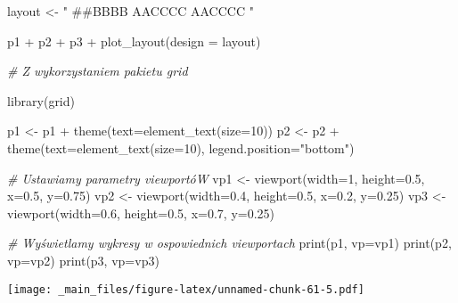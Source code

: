 \documentclass[
]{book}
\newenvironment{Shaded}{\begin{snugshade}}{\end{snugshade}}
\newcommand{\AttributeTok}[1]{\textcolor[rgb]{0.77,0.63,0.00}{#1}}
\newcommand{\CommentTok}[1]{\textcolor[rgb]{0.56,0.35,0.01}{\textit{#1}}}
\newcommand{\DecValTok}[1]{\textcolor[rgb]{0.00,0.00,0.81}{#1}}
\newcommand{\FloatTok}[1]{\textcolor[rgb]{0.00,0.00,0.81}{#1}}
\newcommand{\FunctionTok}[1]{\textcolor[rgb]{0.00,0.00,0.00}{#1}}
\newcommand{\NormalTok}[1]{#1}
\newcommand{\OtherTok}[1]{\textcolor[rgb]{0.56,0.35,0.01}{#1}}
\newcommand{\SpecialCharTok}[1]{\textcolor[rgb]{0.00,0.00,0.00}{#1}}
\newcommand{\StringTok}[1]{\textcolor[rgb]{0.31,0.60,0.02}{#1}}
\begin{document}
\begin{Shaded}
\begin{Highlighting}[]
\NormalTok{layout }\OtherTok{\textless{}{-}} \StringTok{"}
\StringTok{\#\#BBBB}
\StringTok{AACCCC}
\StringTok{AACCCC}
\StringTok{"}

\NormalTok{p1 }\SpecialCharTok{+}\NormalTok{ p2 }\SpecialCharTok{+}\NormalTok{ p3 }\SpecialCharTok{+} 
  \FunctionTok{plot\_layout}\NormalTok{(}\AttributeTok{design =}\NormalTok{ layout)}

\CommentTok{\# Z wykorzystaniem pakietu grid}

\FunctionTok{library}\NormalTok{(grid)}

\NormalTok{p1 }\OtherTok{\textless{}{-}}\NormalTok{ p1 }\SpecialCharTok{+} \FunctionTok{theme}\NormalTok{(}\AttributeTok{text=}\FunctionTok{element\_text}\NormalTok{(}\AttributeTok{size=}\DecValTok{10}\NormalTok{))}
\NormalTok{p2 }\OtherTok{\textless{}{-}}\NormalTok{ p2 }\SpecialCharTok{+} \FunctionTok{theme}\NormalTok{(}\AttributeTok{text=}\FunctionTok{element\_text}\NormalTok{(}\AttributeTok{size=}\DecValTok{10}\NormalTok{), }\AttributeTok{legend.position=}\StringTok{"bottom"}\NormalTok{)}

\CommentTok{\# Ustawiamy parametry viewportóW}
\NormalTok{vp1 }\OtherTok{\textless{}{-}} \FunctionTok{viewport}\NormalTok{(}\AttributeTok{width=}\DecValTok{1}\NormalTok{, }\AttributeTok{height=}\FloatTok{0.5}\NormalTok{, }\AttributeTok{x=}\FloatTok{0.5}\NormalTok{, }\AttributeTok{y=}\FloatTok{0.75}\NormalTok{)}
\NormalTok{vp2 }\OtherTok{\textless{}{-}} \FunctionTok{viewport}\NormalTok{(}\AttributeTok{width=}\FloatTok{0.4}\NormalTok{, }\AttributeTok{height=}\FloatTok{0.5}\NormalTok{, }\AttributeTok{x=}\FloatTok{0.2}\NormalTok{, }\AttributeTok{y=}\FloatTok{0.25}\NormalTok{)}
\NormalTok{vp3 }\OtherTok{\textless{}{-}} \FunctionTok{viewport}\NormalTok{(}\AttributeTok{width=}\FloatTok{0.6}\NormalTok{, }\AttributeTok{height=}\FloatTok{0.5}\NormalTok{, }\AttributeTok{x=}\FloatTok{0.7}\NormalTok{, }\AttributeTok{y=}\FloatTok{0.25}\NormalTok{)}

\CommentTok{\# Wyświetlamy wykresy w ospowiednich viewportach}
\FunctionTok{print}\NormalTok{(p1, }\AttributeTok{vp=}\NormalTok{vp1)}
\FunctionTok{print}\NormalTok{(p2, }\AttributeTok{vp=}\NormalTok{vp2)}
\FunctionTok{print}\NormalTok{(p3, }\AttributeTok{vp=}\NormalTok{vp3)}
\end{Highlighting}
\end{Shaded}

\texttt{[image: \_main\_files/figure-latex/unnamed-chunk-61-5.pdf]}
\end{document}
